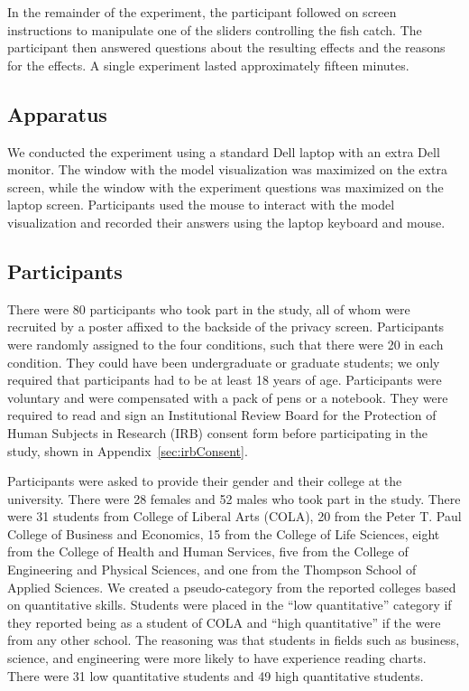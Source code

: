 In the remainder of the experiment, the participant followed on screen instructions to manipulate one of the sliders controlling the fish catch.  The participant then answered questions about the resulting effects and the reasons for the effects.  A single experiment lasted approximately fifteen minutes.

\subsection{Apparatus}

We conducted the experiment using a standard Dell laptop with an extra Dell monitor.  The window with the model visualization was maximized on the extra screen, while the window with the experiment questions was maximized on the laptop screen.  Participants used the mouse to interact with the model visualization and recorded their answers using the laptop keyboard and mouse.

\subsection{Participants} \label{sec:participants}

There were 80 participants who took part in the study, all of whom were recruited by a poster affixed to the backside of the privacy screen.  Participants were randomly assigned to the four conditions, such that there were 20 in each condition.  They could have been undergraduate or graduate students; we only required that participants had to be at least 18 years of age.  Participants were voluntary and were compensated with a pack of pens or a notebook.  They were required to read and sign an Institutional Review Board for the Protection of Human Subjects in Research (IRB) consent form before participating in the study, shown in Appendix~\ref{sec:irbConsent}.

Participants were asked to provide their gender and their college at the university.  There were 28 females and 52 males who took part in the study.  There were 31 students from College of Liberal Arts (COLA), 20 from the Peter T. Paul College of Business and Economics, 15 from the College of Life Sciences, eight from the College of Health and Human Services, five from the College of Engineering and Physical Sciences, and one from the Thompson School of Applied Sciences.  We created a pseudo-category from the reported colleges based on quantitative skills.  Students were placed in the ``low quantitative'' category if they reported being as a student of COLA and ``high quantitative'' if the were from any other school.  The reasoning was that students in fields such as business, science, and engineering were more likely to have experience reading charts.  There were 31 low quantitative students and 49 high quantitative students.

